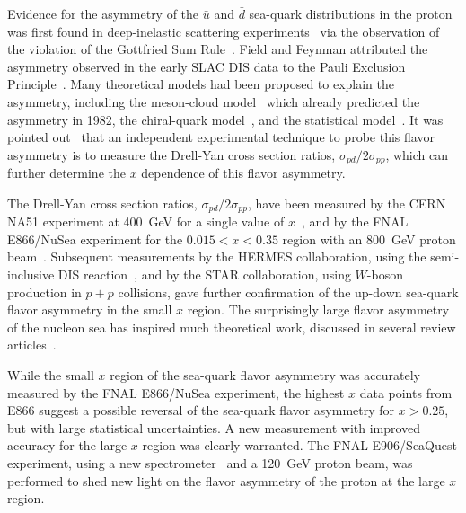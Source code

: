 \documentclass[reprint,aps,unsortedaddress,superscriptaddress,prl,floatfix,showpacs,linenumbers]{revtex4-2}
\begin{document}
Evidence for the asymmetry of the $\bar{u}$ and $\bar{d}$ sea-quark
distributions in the proton was first found in
deep-inelastic scattering experiments~\cite{stein1975,amaudruz1991,arneodo1994} via
the observation of the violation
of the Gottfried Sum Rule~\cite{gottfried1967}. Field and Feynman
attributed the asymmetry observed in the early SLAC DIS data to the Pauli
Exclusion Principle~\cite{field1977}.
Many theoretical models had been proposed to explain the
asymmetry, including the meson-cloud model~\cite{thomas1983,speth1997} which already predicted the asymmetry in 1982,
the chiral-quark model~\cite{szczurek1996}, and the statistical model~\cite{bourrely2002,bourrely2015}.
It was pointed out~\cite{ellis1991}
that an independent experimental technique to probe this flavor asymmetry is
to measure the Drell-Yan cross section ratios,
$\sigma_{pd}/2\sigma_{pp}$, which can further determine the $x$ dependence
of this flavor asymmetry.

The Drell-Yan cross section ratios,
$\sigma_{pd}/2\sigma_{pp}$, have been measured by the CERN NA51 experiment at
\SI{400}{\GeV} for a single value of $x$~\cite{NA51:1994xrz}, and by the FNAL
E866/NuSea experiment for the $0.015 < x < 0.35$ region with an \SI{800}{\GeV}
proton beam~\cite{hawker1998,peng1998,towell2001}. Subsequent measurements by the
HERMES collaboration, using the semi-inclusive DIS reaction~\cite{ackerstaff1998},
and by the STAR collaboration, using $W$-boson production in $p+p$ collisions,
gave further confirmation of the up-down sea-quark flavor asymmetry in
the small $x$ region. The surprisingly large flavor asymmetry of the nucleon
sea has inspired much theoretical work, discussed in several review
articles~\cite{kumano1998,vogt2000a,garvey2001,chang2014,geesaman2019}.

While the small $x$ region of the sea-quark flavor asymmetry was accurately
measured by the FNAL E866/NuSea experiment, the highest $x$ data points from
E866 suggest a possible reversal of the sea-quark flavor asymmetry for $x > 0.25$,
but with large statistical uncertainties. A new measurement with improved
accuracy for the large $x$ region was clearly warranted. The FNAL
E906/SeaQuest experiment, using a new spectrometer~\cite{aidala2019} and
a \SI{120}{\GeV} proton beam, was performed to shed new light on the flavor asymmetry
of the proton at the large $x$ region.
\end{document}
